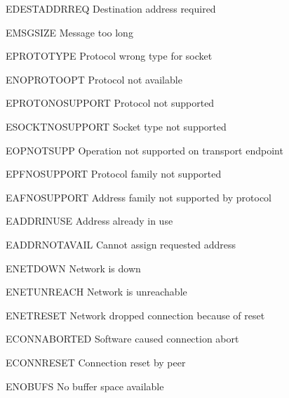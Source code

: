 \begin{datadesc}{EDESTADDRREQ} Destination address required \end{datadesc}
\begin{datadesc}{EMSGSIZE} Message too long \end{datadesc}
\begin{datadesc}{EPROTOTYPE} Protocol wrong type for socket \end{datadesc}
\begin{datadesc}{ENOPROTOOPT} Protocol not available \end{datadesc}
\begin{datadesc}{EPROTONOSUPPORT} Protocol not supported \end{datadesc}
\begin{datadesc}{ESOCKTNOSUPPORT} Socket type not supported \end{datadesc}
\begin{datadesc}{EOPNOTSUPP} Operation not supported on transport endpoint \end{datadesc}
\begin{datadesc}{EPFNOSUPPORT} Protocol family not supported \end{datadesc}
\begin{datadesc}{EAFNOSUPPORT} Address family not supported by protocol \end{datadesc}
\begin{datadesc}{EADDRINUSE} Address already in use \end{datadesc}
\begin{datadesc}{EADDRNOTAVAIL} Cannot assign requested address \end{datadesc}
\begin{datadesc}{ENETDOWN} Network is down \end{datadesc}
\begin{datadesc}{ENETUNREACH} Network is unreachable \end{datadesc}
\begin{datadesc}{ENETRESET} Network dropped connection because of reset \end{datadesc}
\begin{datadesc}{ECONNABORTED} Software caused connection abort \end{datadesc}
\begin{datadesc}{ECONNRESET} Connection reset by peer \end{datadesc}
\begin{datadesc}{ENOBUFS} No buffer space available \end{datadesc}
